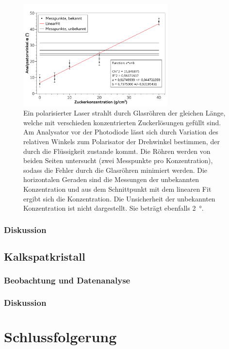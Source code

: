 \documentclass[
	a4paper,
	12pt,
	pagesize,
	ngerman
]{scrartcl}
\begin{document}
	\begin{figure}[H]
		\includegraphics[width=0.7\textwidth]{fig_Zucker}
		\centering
		\caption{Ein polarisierter Laser strahlt durch Glasröhren der gleichen Länge, welche mit verschieden konzentrierten Zuckerlösungen gefüllt sind. 
		Am Analysator vor der Photodiode lässt sich durch Variation des relativen Winkels zum Polarisator der Drehwinkel bestimmen, der durch die Flüssigkeit zustande kommt.
		Die Röhren werden von beiden Seiten untersucht (zwei Messpunkte pro Konzentration), sodass die Fehler durch die Glasröhren minimiert werden.
		Die horizontalen Geraden sind die Messungen der unbekannten Konzentration und aus dem Schnittpunkt mit dem linearen Fit ergibt sich die Konzentration.
		Die Unsicherheit der unbekannten Konzentration ist nicht dargestellt. Sie beträgt ebenfalls \SI{2}{\degree}.
		}
		\label{fig_zucker}
		\centering
	\end{figure}

	\subsubsection{Diskussion}
	
	\subsection{Kalkspatkristall}
	\subsubsection{Beobachtung und Datenanalyse}
	
	\subsubsection{Diskussion}
	
	
	
	\section{Schlussfolgerung}
	
	\printbibliography
\end{document}
